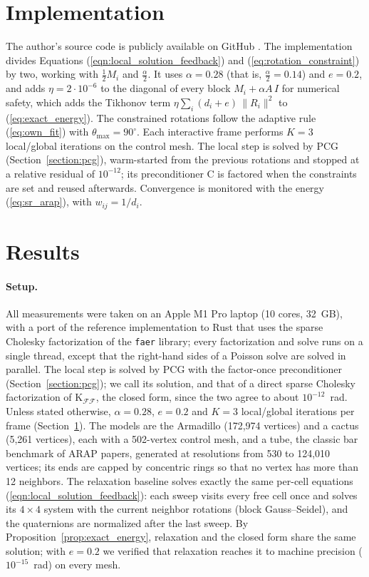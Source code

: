 \documentclass{birkjour}
\theoremstyle{remark}
\numberwithin{equation}{section}
\begin{document}
\section{Implementation}
\label{section:implementation}

The author's source code is publicly available on GitHub \cite{GALinearizedArap}. The implementation divides Equations (\ref{eqn:local_solution_feedback}) and (\ref{eq:rotation_constraint}) by two, working with $\frac{1}{2} M_i$ and $\frac{\alpha}{2}$. It uses $\alpha = 0.28$ (that is, $\frac{\alpha}{2} = 0.14$) and $e = 0.2$, and adds $\eta = 2 \cdot 10^{-6}$ to the diagonal of every block $M_i + \alpha A \, I$ for numerical safety, which adds the Tikhonov term $\eta \sum_i (d_i + e) \, \|R_i\|^2$ to (\ref{eq:exact_energy}). The constrained rotations follow the adaptive rule (\ref{eq:own_fit}) with $\theta_{\max} = 90^\circ$. Each interactive frame performs $K = 3$ local/global iterations on the control mesh. The local step is solved by PCG (Section~\ref{section:pcg}), warm-started from the previous rotations and stopped at a relative residual of $10^{-12}$; its preconditioner $\mathrm C$ is factored when the constraints are set and reused afterwards. Convergence is monitored with the energy (\ref{eq:sr_arap}), with $w_{ij} = 1/d_i$.

\section{Results}
\label{section:results}

\paragraph{Setup.} All measurements were taken on an Apple M1 Pro laptop (10 cores, 32~GB), with a port of the reference implementation \cite{GALinearizedArap} to Rust that uses the sparse Cholesky factorization of the \texttt{faer} library; every factorization and solve runs on a single thread, except that the right-hand sides of a Poisson solve are solved in parallel. The local step is solved by PCG with the factor-once preconditioner (Section~\ref{section:pcg}); we call its solution, and that of a direct sparse Cholesky factorization of $\mathrm K_{\mathcal F \mathcal F}$, the closed form, since the two agree to about $10^{-12}$~rad. Unless stated otherwise, $\alpha = 0.28$, $e = 0.2$ and $K = 3$ local/global iterations per frame (Section~\ref{section:implementation}). The models are the Armadillo (172{,}974 vertices) and a cactus (5{,}261 vertices), each with a 502-vertex control mesh, and a tube, the classic bar benchmark of ARAP papers, generated at resolutions from 530 to 124{,}010 vertices; its ends are capped by concentric rings so that no vertex has more than 12 neighbors. The relaxation baseline solves exactly the same per-cell equations (\ref{eqn:local_solution_feedback}): each sweep visits every free cell once and solves its $4 \times 4$ system with the current neighbor rotations (block Gauss--Seidel), and the quaternions are normalized after the last sweep. By Proposition~\ref{prop:exact_energy}, relaxation and the closed form share the same solution; with $e = 0.2$ we verified that relaxation reaches it to machine precision ($10^{-15}$~rad) on every mesh.
\end{document}
